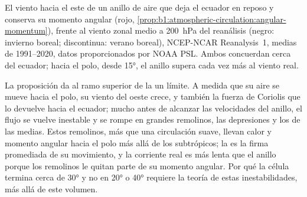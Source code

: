 \begin{omfigure}

{\small El viento hacia el este de un anillo de aire que deja el ecuador en reposo y conserva su momento angular (rojo, \cref{prop:b1:atmospheric-circulation:angular-momentum}), frente al viento zonal medio a \qty{200}{hPa} del reanálisis (negro: invierno boreal; discontinua: verano boreal), NCEP-NCAR Reanalysis~1, medias de 1991--2020, datos proporcionados por NOAA PSL. Ambos concuerdan cerca del ecuador; hacia el polo, desde \ang{15}, el anillo supera cada vez más al viento real.}
\label{fig:b1:atmospheric-circulation:angular-momentum}
\end{omfigure}

La proposición da al ramo superior de la  un límite. A medida que su aire se mueve hacia el polo, su viento del oeste crece, y también la fuerza de Coriolis que lo devuelve hacia el ecuador; mucho antes de alcanzar las velocidades del anillo, el flujo se vuelve inestable y se rompe en grandes remolinos, las depresiones y los  de las  medias. Estos remolinos, más que una circulación suave, llevan calor y momento angular hacia el polo más allá de los subtrópicos; la  es la firma promediada de su movimiento, y la corriente real es más lenta que el anillo porque los remolinos le quitan parte de su momento angular. Por qué la célula termina cerca de \ang{30} y no en \ang{20} o \ang{40} requiere la teoría de estas inestabilidades, más allá de este volumen.

